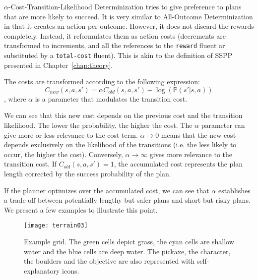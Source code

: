 \documentclass[../root.tex]{subfiles}
\begin{document}
$\alpha$-Cost-Transition-Likelihood Determinization tries to give preference
to plans that are more likely to succeed. It is very similar to All-Outcome
Determinization in that it creates an action per outcome. However, it does
not discard the rewards completely. Instead, it reformulates them as
action costs (decrements are transformed to increments, and all the references
to the \texttt{reward} fluent ar substituted by a \texttt{total-cost} fluent).
This is akin to the definition of SSPP presented in Chapter~\ref{chap:theory}.

The costs are transformed according to the following expression:
\[ C_{new}(s,a,s') = \alpha C_{old}(s,a,s') - \log (\mathbb{P}(s'|s,a)) \],
where $ \alpha $ is a parameter that modulates the transition cost.

We can see that this new cost depends on the previous cost and the transition
likelihood. The lower the probability, the higher the cost. The
$ \alpha $ parameter can give more or less relevance to the cost term.
$ \alpha \rightarrow 0 $ means that the new cost depends
exclusively on the likelihood of the transitions (i.e. the less likely to occur,
the higher the cost). Conversely, $ \alpha \rightarrow \infty $ gives more relevance
to the transition cost. If $ C_{old}(s,a,s') = 1 $, the accumulated cost represents
the plan length corrected by the success probability of the plan. 

If the planner optimizes over the accumulated cost, we can see that $ \alpha $
establishes a trade-off between potentially lengthy but safer plans and short but
risky plans. We present a few examples to illustrate this point.

\begin{wrapfigure}{L}{0.4\columnwidth}
	\centering
	\texttt{[image: terrain03]}
	\caption{Example grid. The green cells depict grass, the cyan cells are shallow water
			 and the blue cells are deep water. The pickaxe, the character, the boulders
			 and the objective are also represented with self-explanatory icons.}
	\label{fig:terrain03}
\end{wrapfigure}
\end{document}
